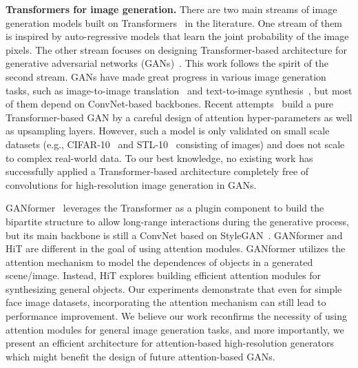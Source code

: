 \documentclass{article}
\newcommand{\p}[1]{\textbf{#1.}}
\begin{document}
\p{Transformers for image generation} There are two main streams of image generation models built on Transformers~\cite{vaswani2017attention} in the literature. One stream of them~\cite{esser2021taming,parmar2018image} is inspired by auto-regressive models that learn the joint probability of the image pixels. The other stream focuses on designing Transformer-based architecture for generative adversarial networks (GANs)~\cite{goodfellow2014generative}. This work follows the spirit of the second stream. GANs have made great progress in various image generation tasks, such as image-to-image translation~\cite{tian2018cr,zhao2018learning,zhao2020towards,zhu2017unpaired} and text-to-image synthesis~\cite{zhang2021cross,zhang2017stackgan}, but most of them depend on ConvNet-based backbones. Recent attempts~\cite{jiang2021transgan,lee2021vitgan} build a pure Transformer-based GAN by a careful design of attention hyper-parameters as well as upsampling layers. However, such a model is only validated on small scale datasets (e.g., CIFAR-10~\cite{krizhevsky2009learning} and STL-10~\cite{coates2011analysis} consisting of  images) and does not scale to complex real-world data. To our best knowledge, no existing work has successfully applied a Transformer-based architecture completely free of convolutions for high-resolution image generation in GANs.

GANformer~\cite{hudson2021generative} leverages the Transformer as a plugin component to build the bipartite structure to allow long-range interactions during the generative process, but its main backbone is still a ConvNet based on StyleGAN~\cite{karras2020analyzing}. GANformer and HiT are different in the goal of using attention modules. GANformer utilizes the attention mechanism to model the dependences of objects in a generated scene/image. Instead, HiT explores building efficient attention modules for synthesizing general objects. Our experiments demonstrate that even for simple face image datasets, incorporating the attention mechanism can still lead to performance improvement. We believe our work reconfirms the necessity of using attention modules for general image generation tasks, and more importantly, we present an efficient architecture for attention-based high-resolution generators which might benefit the design of future attention-based GANs.
\end{document}
